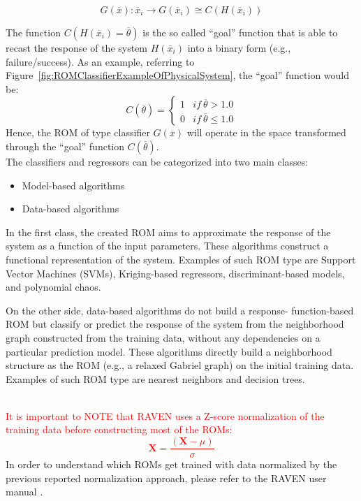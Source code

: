 \begin{equation}
\label{eq:classifier}
G\left ( \overline{x} \right ):\overline{x}_{i} \rightarrow G\left ( \overline{x}_{i} \right ) \cong
C \left ( H\left ( \overline{x}_{i} \right ) \right )
\end{equation}

The function $C\left (  H\left ( \overline{x}_{i}  \right ) = \overline{\theta}
\right ) $ is the so called ``goal'' function that is able to recast the
response of the system $H\left ( \overline{x}_{i}  \right )$ into a binary
form (e.g., failure/success). As an example, referring to
Figure~\ref{fig:ROMClassifierExampleOfPhysicalSystem}, the
``goal'' function would be:
\begin{equation}
\label{eq:goalFunctionClassifier}
C\left (   \overline{\theta}  \right ) = \left\{\begin{matrix}
1 & if \: \overline{\theta}>1.0 \\
0 &  if \: \overline{\theta} \leq 1.0
\end{matrix}\right.
\end{equation}
Hence, the ROM of type classifier $G\left (  \overline{x} \right )$  will operate in the space transformed through the ``goal''  function $C\left (   \overline{\theta}  \right )$.
\\The classifiers and regressors can be categorized into two main classes:
\begin{itemize}
  \item Model-based algorithms
  \item Data-based algorithms
\end{itemize}
In the first class, the created ROM aims to approximate the response
of the system as a function of the input parameters. These algorithms
construct a functional representation of the system. Examples of such ROM type are Support Vector Machines (SVMs), Kriging-based regressors, discriminant-based models, and polynomial chaos.

On the other side, data-based algorithms do not build a response-
function-based ROM but classify or predict the response of the
system from the neighborhood graph constructed from the training
data, without any dependencies on a particular prediction model.
These algorithms directly build a neighborhood structure as the
ROM (e.g., a relaxed Gabriel graph) on the initial training data. Examples of such ROM type are nearest neighbors and decision trees.

\textcolor{red}{\\It is important to NOTE that RAVEN uses a Z-score normalization of the training data before 
  constructing most of the ROMs:
\begin{equation}
  \mathit{\mathbf{X}} = \frac{(\mathit{\mathbf{X}}-\mu )}{\sigma }
\end{equation} 
 } 
In order to understand which ROMs get trained with data normalized by the previous reported normalization approach, please refer to the RAVEN user manual \cite{RAVENuserManual}.

